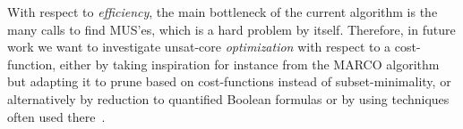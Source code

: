 With respect to \emph{efficiency}, the main bottleneck of the current algorithm is the many calls to find MUS'es, which is a hard problem by itself.
Therefore, in future work we want to investigate unsat-core \emph{optimization} with respect to a cost-function, either by taking inspiration for instance from the MARCO algorithm~\cite{liffiton2013enumerating} but adapting it to prune based on cost-functions instead of subset-minimality, or alternatively by reduction to quantified Boolean formulas or by using techniques often used there~\cite{QBF,DBLP:journals/constraints/IgnatievJM16}.